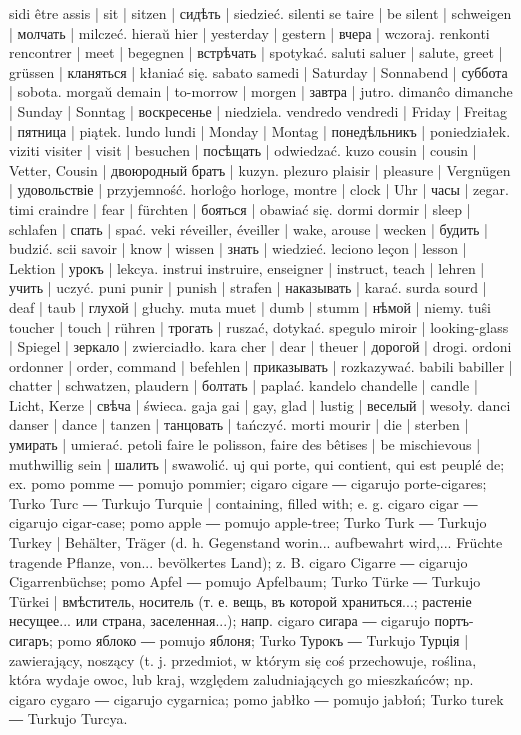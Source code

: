 sidi être assis | sit | sitzen | сидѣть | siedzieć.
silenti se taire | be silent | schweigen | молчать | milczeć.
hieraŭ hier | yesterday | gestern | вчера | wczoraj.
renkonti rencontrer | meet | begegnen | встрѣчать | spotykać.
saluti saluer | salute, greet | grüssen | кланяться | kłaniać się.
sabato samedi | Saturday | Sonnabend | суббота | sobota.
morgaŭ demain | to-morrow | morgen | завтра | jutro.
dimanĉo dimanche | Sunday | Sonntag | воскресенье | niedziela.
vendredo vendredi | Friday | Freitag | пятница | piątek.
lundo lundi | Monday | Montag | понедѣльникъ | poniedziałek.
viziti visiter | visit | besuchen | посѣщать | odwiedzać.
kuzo cousin | cousin | Vetter, Cousin | двоюродный братъ | kuzyn.
plezuro plaisir | pleasure | Vergnügen | удовольствіе | przyjemność.
horloĝo horloge, montre | clock | Uhr | часы | zegar.
timi craindre | fear | fürchten | бояться | obawiać się.
dormi dormir | sleep | schlafen | спать | spać.
veki réveiller, éveiller | wake, arouse | wecken | будить | budzić.
scii savoir | know | wissen | знать | wiedzieć.
leciono leçon | lesson | Lektion | урокъ | lekcya.
instrui instruire, enseigner | instruct, teach | lehren | учить | uczyć.
puni punir | punish | strafen | наказывать | karać.
surda sourd | deaf | taub | глухой | głuchy.
muta muet | dumb | stumm | нѣмой | niemy.
tuŝi toucher | touch | rühren | трогать | ruszać, dotykać.
spegulo miroir | looking-glass | Spiegel | зеркало | zwierciadło.
kara cher | dear | theuer | дорогой | drogi.
ordoni ordonner | order, command | befehlen | приказывать | rozkazywać.
babili babiller | chatter | schwatzen, plaudern | болтать | paplać.
kandelo chandelle | candle | Licht, Kerze | свѣча | świeca.
gaja gai | gay, glad | lustig | веселый | wesoły.
danci danser | dance | tanzen | танцовать | tańczyć.
morti mourir | die | sterben | умирать | umierać.
petoli faire le polisson, faire des bêtises | be mischievous | muthwillig sein | шалить | swawolić.
uj qui porte, qui contient, qui est peuplé de; ex. pomo pomme ― pomujo pommier; cigaro cigare ― cigarujo porte-cigares; Turko Turc ― Turkujo Turquie | containing, filled with; e. g. cigaro cigar ― cigarujo cigar-case; pomo apple ― pomujo apple-tree; Turko Turk ― Turkujo Turkey | Behälter, Träger (d. h. Gegenstand worin... aufbewahrt wird,... Früchte tragende Pflanze, von... bevölkertes Land); z. B. cigaro Cigarre ― cigarujo Cigarrenbüchse; pomo Apfel ― pomujo Apfelbaum; Turko Türke ― Turkujo Türkei | вмѣститель, носитель (т. е. вещь, въ которой храниться...; растеніе несущее... или страна, заселенная...); напр. cigaro сигара ― cigarujo портъ-сигаръ; pomo яблоко ― pomujo яблоня; Turko Турокъ ― Turkujo Турція | zawierający, noszący (t. j. przedmiot, w którym się coś przechowuje, roślina, która wydaje owoc, lub kraj, względem zaludniających go mieszkańców; np. cigaro cygaro ― cigarujo cygarnica; pomo jabłko ― pomujo jabłoń; Turko turek ― Turkujo Turcya.

